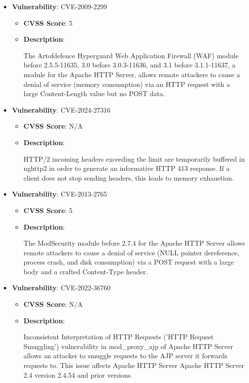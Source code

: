 \documentclass{article}
\begin{document}
\begin{itemize}
    
        \item \textbf{Vulnerability}: CVE-2009-2299
        \begin{itemize}
            \item \textbf{CVSS Score}:  5 
            \item \textbf{Description}:
            \parbox[t]{0.9\linewidth}{
                \ttfamily The Artofdefence Hyperguard Web Application Firewall (WAF) module before 2.5.5-11635, 3.0 before 3.0.3-11636, and 3.1 before 3.1.1-11637, a module for the Apache HTTP Server, allows remote attackers to cause a denial of service (memory consumption) via an HTTP request with a large Content-Length value but no POST data.
            }
        \end{itemize}
    
        \item \textbf{Vulnerability}: CVE-2024-27316
        \begin{itemize}
            \item \textbf{CVSS Score}:  N/A 
            \item \textbf{Description}:
            \parbox[t]{0.9\linewidth}{
                \ttfamily HTTP/2 incoming headers exceeding the limit are temporarily buffered in nghttp2 in order to generate an informative HTTP 413 response. If a client does not stop sending headers, this leads to memory exhaustion.
            }
        \end{itemize}
    
        \item \textbf{Vulnerability}: CVE-2013-2765
        \begin{itemize}
            \item \textbf{CVSS Score}:  5 
            \item \textbf{Description}:
            \parbox[t]{0.9\linewidth}{
                \ttfamily The ModSecurity module before 2.7.4 for the Apache HTTP Server allows remote attackers to cause a denial of service (NULL pointer dereference, process crash, and disk consumption) via a POST request with a large body and a crafted Content-Type header.
            }
        \end{itemize}
    
        \item \textbf{Vulnerability}: CVE-2022-36760
        \begin{itemize}
            \item \textbf{CVSS Score}:  N/A 
            \item \textbf{Description}:
            \parbox[t]{0.9\linewidth}{
                \ttfamily Inconsistent Interpretation of HTTP Requests ('HTTP Request Smuggling') vulnerability in mod\_proxy\_ajp of Apache HTTP Server allows an attacker to smuggle requests to the AJP server it forwards requests to.  This issue affects Apache HTTP Server Apache HTTP Server 2.4 version 2.4.54 and prior versions.
            }
        \end{itemize}
    

\end{itemize}
\end{document}
